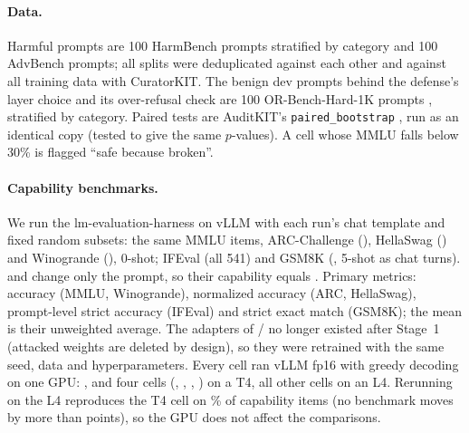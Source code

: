 \paragraph{Data.} Harmful prompts are 100 HarmBench prompts stratified by category and 100 AdvBench prompts; all
splits were deduplicated against each other and against all training data with CuratorKIT. The benign dev prompts
behind the defense's layer choice and its over-refusal check are 100 OR-Bench-Hard-1K prompts
\citep{cui2024orbench}, stratified by category. Paired tests are
AuditKIT's \texttt{paired\_bootstrap} \citep{arora2026auditkitunifiedevaluationspine,auditkit2026}, run as an identical copy (tested to give the same $p$-values). A cell whose MMLU falls below 30\% is
flagged ``safe because broken''.

\paragraph{Capability benchmarks\stagetwo.} We run the lm-evaluation-harness on vLLM with each run's chat
template and fixed random subsets: the same  MMLU items, ARC-Challenge (), HellaSwag
() and Winogrande (), 0-shot; IFEval (all 541) and GSM8K
(, 5-shot as chat turns).  and  change only the prompt, so their capability
equals . Primary metrics: accuracy (MMLU, Winogrande), normalized accuracy (ARC, HellaSwag), prompt-level
strict accuracy (IFEval) and strict exact match (GSM8K); the mean is their unweighted average. The adapters of
/ no longer existed after Stage~1 (attacked weights are deleted by design), so they were retrained
with the same seed, data and hyperparameters. Every cell ran vLLM fp16 with greedy decoding on one GPU: ,
 and four  cells (, , , ) on a T4, all other cells on an L4.
Rerunning   on the L4 reproduces the T4 cell on \% of capability items (no
benchmark moves by more than  points), so the GPU does not affect the comparisons.

